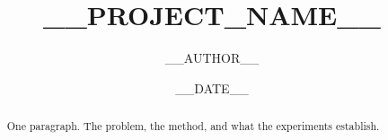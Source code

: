 \documentclass[11pt]{article}
\title{__PROJECT_NAME__}
\author{__AUTHOR__}
\date{__DATE__}
\begin{document}
\maketitle

\begin{abstract}
One paragraph. The problem, the method, and what the experiments establish.
\end{abstract}










\end{document}
